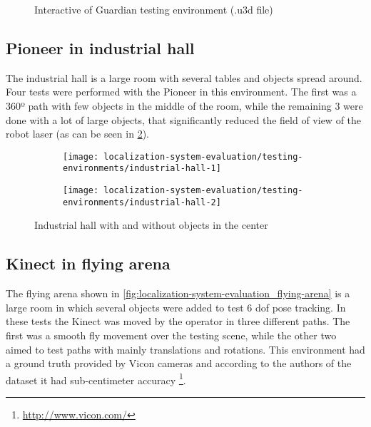 \begin{figure}[H]
	\centering
	\caption{Interactive  of Guardian testing environment (.u3d file)}
	\label{fig:localization-system-evaluation_guardian-tests-environment-interactive}
\end{figure}



\subsection{Pioneer in industrial hall}

The industrial hall is a large room with several tables and objects spread around. Four tests were performed with the Pioneer in this environment. The first was a 360º path with few objects in the middle of the room, while the remaining 3 were done with a lot of large objects, that significantly reduced the field of view of the robot laser (as can be seen in \cref{fig:localization-system-evaluation_industrial-hall}).

\begin{figure}[H]
	\centering
	\begin{subfigure}[h]{.497\textwidth}
		\centering
		\texttt{[image: localization-system-evaluation/testing-environments/industrial-hall-1]}
	\end{subfigure}
	\begin{subfigure}[h]{.497\textwidth}
		\centering
		\texttt{[image: localization-system-evaluation/testing-environments/industrial-hall-2]}
	\end{subfigure}
	\caption{Industrial hall with and without objects in the center \cite{Sturm2012}}
	\label{fig:localization-system-evaluation_industrial-hall}
\end{figure}



\subsection{Kinect in flying arena}

The flying arena shown in \cref{fig:localization-system-evaluation_flying-arena} is a large room in which several objects were added to test 6 \gls{dof} pose tracking. In these tests the Kinect was moved by the operator in three different paths. The first was a smooth fly movement over the testing scene, while the other two aimed to test paths with mainly translations and rotations. This environment had a ground truth provided by Vicon cameras and according to the authors of the dataset \cite{Pomerleau2011} it had sub-centimeter accuracy \footnote{\url{http://www.vicon.com/}}.

